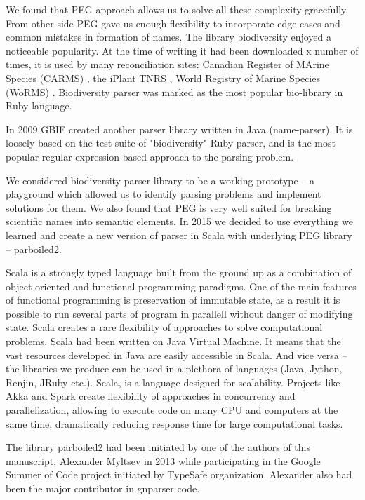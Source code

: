 \documentclass{bmcart}
\begin{document}
We found that PEG approach allows us to solve all these complexity gracefully.
From other side PEG gave us enough flexibility to incorporate edge cases and
common mistakes in formation of names. The library biodiversity enjoyed a
noticeable popularity. At the time of writing it had been downloaded x number
of times, it is used by many reconciliation sites: Canadian Register of MArine
Species (CARMS) \cite{carms}, the iPlant TNRS \cite{iplant}, World Registry of
Marine Species (WoRMS) \cite{worms}.  Biodiversity parser was marked as the
most popular bio-library in Ruby language. 

In 2009 GBIF created another parser library written in Java (name-parser). It
is loosely based on the test suite of "biodiversity" Ruby parser, and is the
most popular regular expression-based approach to the parsing problem. 

We considered biodiversity parser library to be a working prototype -- a
playground which allowed us to identify parsing problems and implement
solutions for them. We also found that PEG is very well suited for breaking
scientific names into semantic elements. In 2015 we decided to use everything
we learned and create a new version of parser in Scala with underlying PEG
library -- parboiled2. 

Scala is a strongly typed language built from the ground up as a combination of
object oriented and functional programming paradigms. One of the main features
of functional programming is preservation of immutable state, as a result it is
possible to run several parts of program in parallell without danger of
modifying state. Scala creates a rare flexibility of approaches to solve
computational problems. Scala had been written on Java Virtual Machine. It
means that the vast resources developed in Java are easily accessible in Scala.
And vice versa -- the libraries we produce can be used in a plethora of
languages (Java, Jython, Renjin, JRuby etc.). Scala, is a language designed for
scalability. Projects like Akka and Spark create flexibility of approaches in
concurrency and parallelization, allowing to execute code on many CPU and
computers at the same time, dramatically reducing response time for large
computational tasks. 

The library parboiled2 had been initiated by one of the authors of this
manuscript, Alexander Myltsev in 2013 while participating in the Google Summer
of Code project initiated by TypeSafe organization. Alexander also had been the
major contributor in gnparser code.
\end{document}

